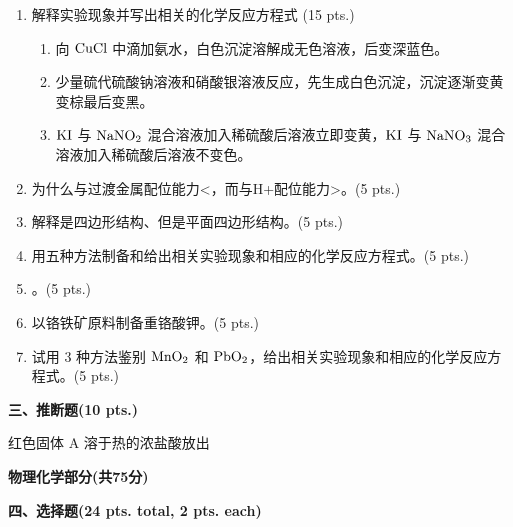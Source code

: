 \begin{enumerate}[label=\arabic*., itemsep=1.5ex]
    \item 解释实验现象并写出相关的化学反应方程式 (15 pts.)
    \begin{enumerate}[label=(\arabic*), noitemsep, topsep=0pt, partopsep=0pt]
        \item 向 $\ce{CuCl}$ 中滴加氨水，白色沉淀溶解成无色溶液，后变深蓝色。
        \item 少量硫代硫酸钠溶液和硝酸银溶液反应，先生成白色沉淀，沉淀逐渐变黄变棕最后变黑。
        \item $\ce{KI}$ 与 $\ce{NaNO2}$ 混合溶液加入稀硫酸后溶液立即变黄，$\ce{KI}$ 与 $\ce{NaNO3}$ 混合溶液加入稀硫酸后溶液不变色。
    \end{enumerate}

    \item 为什么与过渡金属配位能力<，而与H+配位能力>。(5 pts.)

    \item 解释是四边形结构、但是平面四边形结构。(5 pts.)

    \item 用五种方法制备和给出相关实验现象和相应的化学反应方程式。(5 pts.)

    \item 。(5 pts.)

    \item 以铬铁矿原料制备重铬酸钾。(5 pts.)

    \item 试用 3 种方法鉴别 $\ce{MnO2}$ 和 $\ce{PbO2}$，给出相关实验现象和相应的化学反应方程式。(5 pts.)
\end{enumerate}

\vspace{1em}
\noindent\textbf{三、推断题(10 pts.)}

红色固体 A 溶于热的浓盐酸放出

\vspace{1cm}
\begin{center}
    {\Large \textbf{物理化学部分(共75分)}}
\end{center}

\vspace{0.5cm}
\noindent\textbf{四、选择题(24 pts. total, 2 pts. each)}

